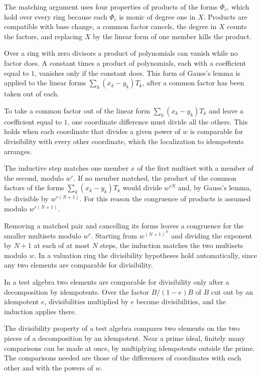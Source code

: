 The matching argument uses four properties of products of the forms $\Phi_c$, which hold over every ring
because each $\Phi_c$ is monic of degree one in $X$. Products are compatible with base change, a common
factor cancels, the degree in $X$ counts the factors, and replacing $X$ by the linear form of one member
kills the product.

Over a ring with zero divisors a product of polynomials can vanish while no factor does. A constant times
a product of polynomials, each with a coefficient equal to $1$, vanishes only if the constant does. This
form of Gauss's lemma is applied to the linear forms $\sum_k(x_k-y_k)T_k$, after a common factor has been
taken out of each.

To take a common factor out of the linear form $\sum_k(x_k-y_k)T_k$ and leave a coefficient equal to
$1$, one coordinate difference must divide all the others. This holds when each coordinate that divides
a given power of $w$ is comparable for divisibility with every other coordinate, which the localization
to idempotents arranges.

The inductive step matches one member $x$ of the first multiset with a member of the second, modulo
$w^r$. If no member matched, the product of the common factors of the forms $\sum_k(x_k-y_k)T_k$ would
divide $w^{rN}$ and, by Gauss's lemma, be divisible by $w^{r(N+1)}$. For this reason the congruence of
products is assumed modulo $w^{r(N+1)}$.

Removing a matched pair and cancelling its forms leaves a congruence for the smaller multisets modulo
$w^r$. Starting from $w^{(N+1)^N}$ and dividing the exponent by $N+1$ at each of at most $N$ steps, the
induction matches the two multisets modulo $w$. In a valuation ring the divisibility hypotheses hold
automatically, since any two elements are comparable for divisibility.

In a test algebra two elements are comparable for divisibility only after a decomposition by idempotents.
Over the factor $B/(1-e)B$ of $B$ cut out by an idempotent $e$, divisibilities multiplied by $e$ become
divisibilities, and the induction applies there.

The divisibility property of a test algebra compares two elements on the two pieces of a decomposition by
an idempotent. Near a prime ideal, finitely many comparisons can be made at once, by multiplying
idempotents outside the prime. The comparisons needed are those of the differences of coordinates with
each other and with the powers of $w$.

